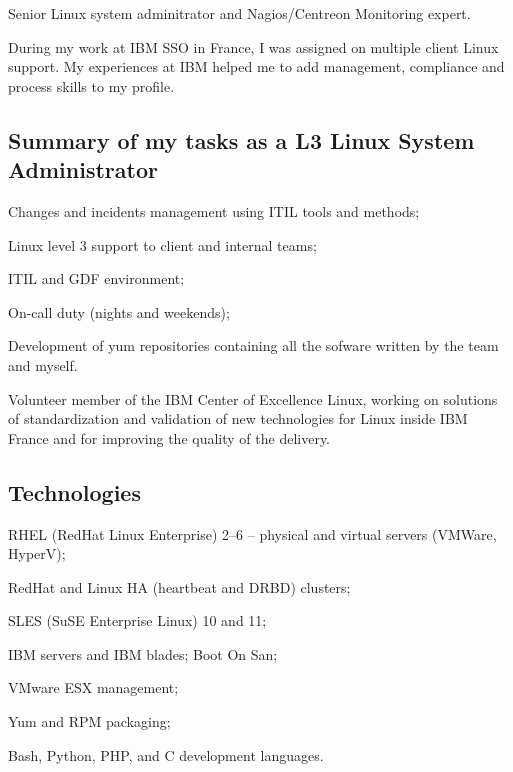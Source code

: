 
\bigskip
{}

\noindent
Senior Linux system adminitrator and Nagios/Centreon Monitoring expert.

During my work at IBM SSO in France, I was assigned on multiple client Linux support.
My experiences at IBM helped me to add management, compliance and process skills 
to my profile. 

\subsection{Summary of my tasks as a L3 Linux System Administrator}

\item{\bdot} Changes and incidents management using ITIL tools and methods;
\item{\bdot} Linux level 3 support to client and internal teams;
\item{\bdot} ITIL and GDF environment;
\item{\bdot} On-call duty (nights and weekends);
\item{\bdot} Development of yum repositories containing all the sofware 
   written by the team and myself.

\smallskip\noindent
Volunteer member of the IBM Center of Excellence Linux, working on solutions of 
standardization and validation of new technologies for Linux inside IBM France and
for improving the quality of the delivery.

\subsection{Technologies}

\item{\bdot} RHEL (RedHat Linux Enterprise) 2--6 -- physical and virtual 
   servers (VMWare, HyperV);
\item{\bdot} RedHat and Linux HA (heartbeat and DRBD) clusters;
\item{\bdot} SLES (SuSE Enterprise Linux) 10 and 11;
\item{\bdot} IBM servers and IBM blades; Boot On San;
\item{\bdot} VMware ESX management;
\item{\bdot} Yum and RPM packaging;
\item{\bdot} Bash, Python, PHP, and C development languages.

